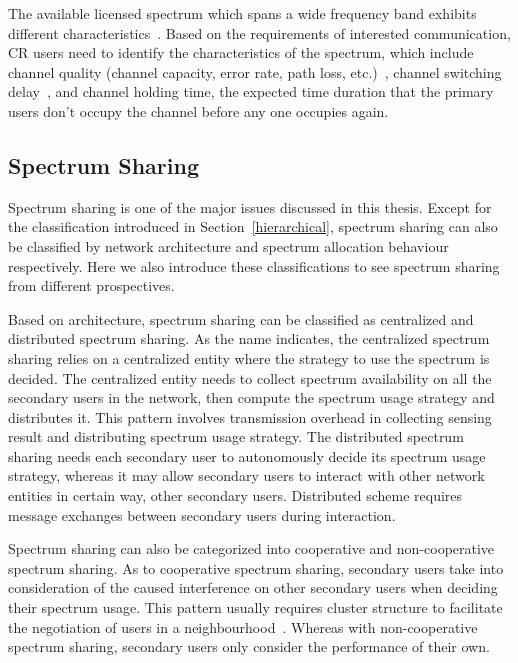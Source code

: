 The available licensed spectrum which spans a wide frequency band exhibits different characteristics~\cite{spectrum_decision_TMC11}.
Based on the requirements of interested communication, CR users need to identify the characteristics of the spectrum, which include channel quality (channel capacity, error rate, path loss, etc.)~\cite{spectrum_decision_TMC11}, channel switching delay~\cite{channel_switch_delay11}, and channel holding time, \ie the expected time duration that the primary users don't occupy the channel before any one occupies again.

\subsection{Spectrum Sharing}
Spectrum sharing is one of the major issues discussed in this thesis.
Except for the classification introduced in Section~\ref{hierarchical}, spectrum sharing can also be classified by network architecture and spectrum allocation behaviour~\cite{Akyildiz09} respectively.
Here we also introduce these classifications to see spectrum sharing from different prospectives.

Based on architecture, spectrum sharing can be classified as centralized and distributed spectrum sharing.
As the name indicates, the centralized spectrum sharing relies on a centralized entity where the strategy to use the spectrum is decided. 
The centralized entity needs to collect spectrum availability on all the secondary users in the network, then compute the spectrum usage strategy and distributes it.
This pattern involves transmission overhead in collecting sensing result and distributing spectrum usage strategy.
The distributed spectrum sharing needs each secondary user to autonomously decide its spectrum usage strategy, whereas it may allow secondary users to interact with other network entities in certain way, \ie other secondary users.
Distributed scheme requires message exchanges between secondary users during interaction.

Spectrum sharing can also be categorized into cooperative and non-cooperative spectrum sharing.
As to cooperative spectrum sharing, secondary users take into consideration of the caused interference on other secondary users when deciding their spectrum usage.
This pattern usually requires cluster structure to facilitate the negotiation of users in a neighbourhood~\cite{Chen07}.
Whereas with non-cooperative spectrum sharing, secondary users only consider the performance of their own.

